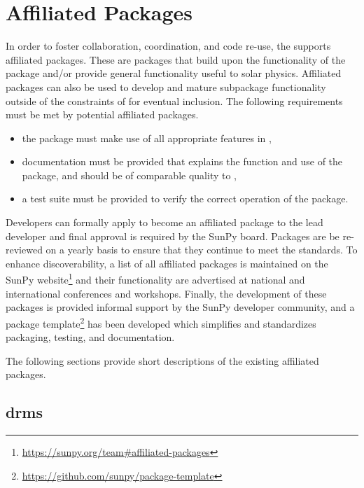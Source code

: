 \section{Affiliated Packages}
\label{sec:affil_package}

In order to foster collaboration, coordination, and code re-use, the \sunpyproj supports affiliated packages.
These are \python packages that build upon the functionality of the \sunpypkg package and/or provide general functionality useful to solar physics.
Affiliated packages can also be used to develop and mature subpackage functionality outside of the constraints of \sunpypkg for eventual inclusion.
The following requirements must be met by potential affiliated packages.
\begin{itemize}
    \item the package must make use of all appropriate features in \sunpypkg,
    \item documentation must be provided that explains the function and use of the package, and should be of comparable quality to \sunpypkg,
    \item a test suite must be provided to verify the correct operation of the package.
\end{itemize}
Developers can formally apply to become an affiliated package to the lead developer and final approval is required by the SunPy board.
Packages are be re-reviewed on a yearly basis to ensure that they continue to meet the standards.
To enhance discoverability, a list of all affiliated packages is maintained on the SunPy website\footnote{\url{https://sunpy.org/team\#affiliated-packages}} and their functionality are advertised at national and international conferences and workshops.
Finally, the development of these packages is provided informal support by the SunPy developer community, and
a package template\footnote{\url{https://github.com/sunpy/package-template}} has been developed which simplifies and standardizes packaging, testing, and documentation.

The following sections provide short descriptions of the existing affiliated packages.

\subsection{drms}
\label{sec:drms}

